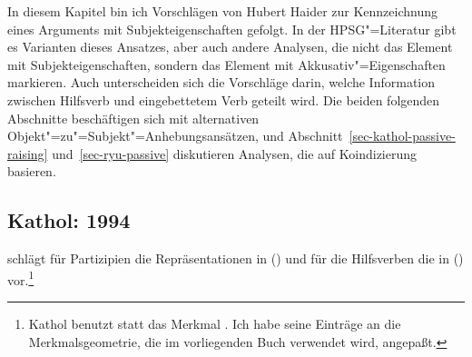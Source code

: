 {%


In diesem Kapitel bin ich Vorschlägen von Hubert Haider zur Kennzeichnung eines Arguments 
mit Subjekteigenschaften gefolgt. In der HPSG"=Literatur gibt es Varianten dieses Ansatzes,
aber auch andere Analysen, die nicht das Element mit Subjekteigenschaften, sondern
das Element mit Akkusativ"=Eigenschaften markieren. Auch unterscheiden sich die Vorschläge
darin, welche Information zwischen Hilfsverb und eingebettetem Verb geteilt wird.
Die beiden folgenden Abschnitte beschäftigen sich mit alternativen Objekt"=zu"=Subjekt"=Anhebungsansätzen,
und Abschnitt~\ref{sec-kathol-passive-raising} und~\ref{sec-ryu-passive} diskutieren
Analysen, die auf Koindizierung basieren.



\subsection{Kathol: 1994}
\label{sec-kathol-passive}

\mbox{}\citet[Kapitel~7.3.3]{Kathol94a} schlägt für Partizipien die Repräsentationen in
() und für die Hilfsverben die in () vor.\footnote{
        Kathol benutzt statt \comps das Merkmal \comps. Ich habe seine Einträge an die Merkmalsgeometrie,
        die im vorliegenden Buch verwendet wird, angepaßt.%
}

}
